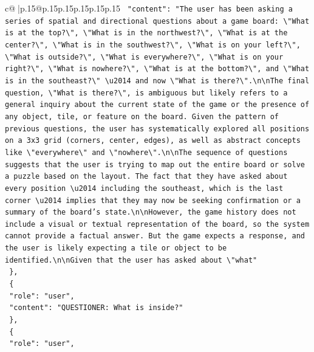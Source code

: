 \documentclass{article}
\begin{document}
{\begin{supertabular}{c@{$\;$}|p{.15\linewidth}@{}p{.15\linewidth}p{.15\linewidth}p{.15\linewidth}p{.15\linewidth}p{.15\linewidth}}
{{{\texttt{    "content": "The user has been asking a series of spatial and directional questions about a game board: \textbackslash{}"What is at the top?\textbackslash{}", \textbackslash{}"What is in the northwest?\textbackslash{}", \textbackslash{}"What is at the center?\textbackslash{}", \textbackslash{}"What is in the southwest?\textbackslash{}", \textbackslash{}"What is on your left?\textbackslash{}", \textbackslash{}"What is outside?\textbackslash{}", \textbackslash{}"What is everywhere?\textbackslash{}", \textbackslash{}"What is on your right?\textbackslash{}", \textbackslash{}"What is nowhere?\textbackslash{}", \textbackslash{}"What is at the bottom?\textbackslash{}", and \textbackslash{}"What is in the southeast?\textbackslash{}" \textbackslash{}u2014 and now \textbackslash{}"What is there?\textbackslash{}".\textbackslash{}n\textbackslash{}nThe final question, \textbackslash{}"What is there?\textbackslash{}", is ambiguous but likely refers to a general inquiry about the current state of the game or the presence of any object, tile, or feature on the board. Given the pattern of previous questions, the user has systematically explored all positions on a 3x3 grid (corners, center, edges), as well as abstract concepts like \textbackslash{}"everywhere\textbackslash{}" and \textbackslash{}"nowhere\textbackslash{}".\textbackslash{}n\textbackslash{}nThe sequence of questions suggests that the user is trying to map out the entire board or solve a puzzle based on the layout. The fact that they have asked about every position \textbackslash{}u2014 including the southeast, which is the last corner \textbackslash{}u2014 implies that they may now be seeking confirmation or a summary of the board's state.\textbackslash{}n\textbackslash{}nHowever, the game history does not include a visual or textual representation of the board, so the system cannot provide a factual answer. But the game expects a response, and the user is likely expecting a tile or object to be identified.\textbackslash{}n\textbackslash{}nGiven that the user has asked about \textbackslash{}"what"} \\
\texttt{  \},} \\
\texttt{  \{} \\
\texttt{    "role": "user",} \\
\texttt{    "content": "QUESTIONER: What is inside?"} \\
\texttt{  \},} \\
\texttt{  \{} \\
\texttt{    "role": "user",} \\
}}}
\end{supertabular}}
\end{document}
